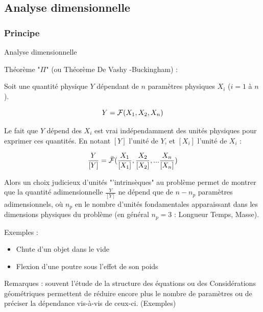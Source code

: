\subsection{\bfseries Analyse dimensionnelle}


\subsubsection{Principe}
\begin{frame}{Analyse dimensionnelle}

\small


Théorème "$\Pi$" (ou Théorème De Vashy -Buckingham) :

\pause 
\medskip

Soit une quantité physique $Y$ dépendant de $n$ paramètres physiques $X_i$ ($i=1$ à $n$).

$$
{Y} = {\cal F }(X_1, X_2, X_n)
$$
\pause

Le fait que $Y$ dépend des $X_i$ est vrai indépendamment des unités physiques pour exprimer ces quantités. En notant $[Y]$ l'unité de $Y$, et $[X_i]$ l'unité de $X_i$ :

$$
\frac{Y}{[Y]} = \bar{\cal F }( \frac{X_1}{[X_1]}, \frac{X_2}{[X_2]}, ... \frac{X_n}{[X_n]})
$$
\pause

Alors un choix judicieux d'unités "'intrinsèques" au problème permet de montrer que la quantité adimensionnelle $\frac{Y}{[Y]}$ ne dépend que de $n-n_p$ paramètres adimensionnels, où $n_p$ en le nombre d'unités fondamentales apparaissant dans les dimensions physiques du problème (en général $n_p = 3$ : Longueur Temps, Masse).

\pause 
\medskip

Exemples : 

\medskip 
\begin{itemize}
\item Chute d'un objet dans le vide

\medskip 

\item  Flexion d'une poutre sous l'effet de son poids
 \end{itemize}
 
 
 \pause 


Remarques : souvent l'étude de la {\color{red} structure des équations } ou des {\color{purple} Considérations géométriques} permettent de réduire encore plus le nombre de paramètres ou de préciser la dépendance vis-à-vis de ceux-ci. {\color{green}(Exemples)} 


\vspace{0mm}

\end{frame}



